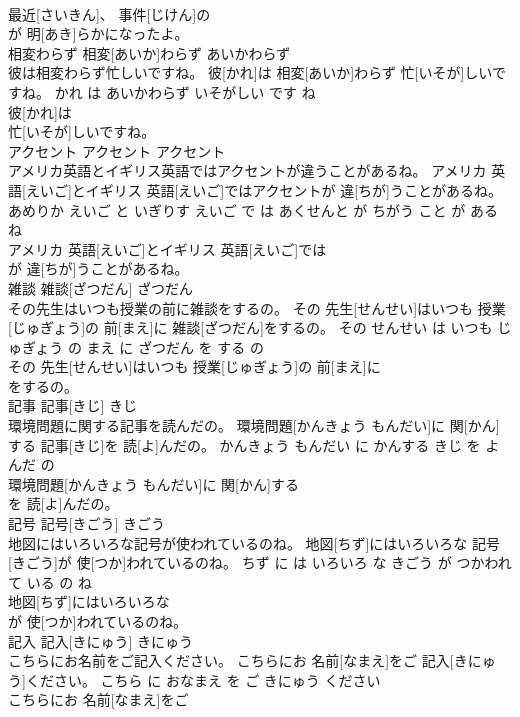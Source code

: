 \documentclass[8pt]{extreport}
\begin{document}
\begin{CJK}{UTF8}{min}
\\	最近[さいきん]、 事件[じけん]の
\\	が 明[あき]らかになったよ。			
\\	相変わらず	相変[あいか]わらず	あいかわらず	
\\	彼は相変わらず忙しいですね。	彼[かれ]は 相変[あいか]わらず 忙[いそが]しいですね。	かれ は あいかわらず いそがしい です ね	
\\	彼[かれ]は
\\	忙[いそが]しいですね。			
\\	アクセント	アクセント	アクセント	
\\	アメリカ英語とイギリス英語ではアクセントが違うことがあるね。	アメリカ 英語[えいご]とイギリス 英語[えいご]ではアクセントが 違[ちが]うことがあるね。	あめりか えいご と いぎりす えいご で は あくせんと が ちがう こと が ある ね	
\\	アメリカ 英語[えいご]とイギリス 英語[えいご]では
\\	が 違[ちが]うことがあるね。			
\\	雑談	雑談[ざつだん]	ざつだん	
\\	その先生はいつも授業の前に雑談をするの。	その 先生[せんせい]はいつも 授業[じゅぎょう]の 前[まえ]に 雑談[ざつだん]をするの。	その せんせい は いつも じゅぎょう の まえ に ざつだん を する の	
\\	その 先生[せんせい]はいつも 授業[じゅぎょう]の 前[まえ]に
\\	をするの。			
\\	記事	記事[きじ]	きじ	
\\	環境問題に関する記事を読んだの。	環境問題[かんきょう もんだい]に 関[かん]する 記事[きじ]を 読[よ]んだの。	かんきょう もんだい に かんする きじ を よんだ の	
\\	環境問題[かんきょう もんだい]に 関[かん]する
\\	を 読[よ]んだの。			
\\	記号	記号[きごう]	きごう	
\\	地図にはいろいろな記号が使われているのね。	地図[ちず]にはいろいろな 記号[きごう]が 使[つか]われているのね。	ちず に は いろいろ な きごう が つかわれて いる の ね	
\\	地図[ちず]にはいろいろな
\\	が 使[つか]われているのね。			
\\	記入	記入[きにゅう]	きにゅう	
\\	こちらにお名前をご記入ください。	こちらにお 名前[なまえ]をご 記入[きにゅう]ください。	こちら に おなまえ を ご きにゅう ください	
\\	こちらにお 名前[なまえ]をご

\end{CJK}
\end{document}
